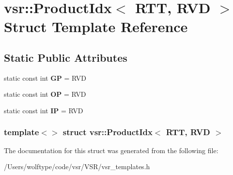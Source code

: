 \hypertarget{structvsr_1_1_product_idx_3_01_r_t_t_00_01_r_v_d_01_4}{\section{vsr\-:\-:Product\-Idx$<$ R\-T\-T, R\-V\-D $>$ Struct Template Reference}
\label{structvsr_1_1_product_idx_3_01_r_t_t_00_01_r_v_d_01_4}
}
\subsection*{Static Public Attributes}
\begin{DoxyCompactItemize}
\item 
\hypertarget{structvsr_1_1_product_idx_3_01_r_t_t_00_01_r_v_d_01_4_a11702264da52b8011ecba62f3e8ba9cc}{static const int {\bfseries G\-P} = R\-V\-D}\label{structvsr_1_1_product_idx_3_01_r_t_t_00_01_r_v_d_01_4_a11702264da52b8011ecba62f3e8ba9cc}

\item 
\hypertarget{structvsr_1_1_product_idx_3_01_r_t_t_00_01_r_v_d_01_4_a3cf9b0e1d77b5bbb03cc92c2091abf68}{static const int {\bfseries O\-P} = R\-V\-D}\label{structvsr_1_1_product_idx_3_01_r_t_t_00_01_r_v_d_01_4_a3cf9b0e1d77b5bbb03cc92c2091abf68}

\item 
\hypertarget{structvsr_1_1_product_idx_3_01_r_t_t_00_01_r_v_d_01_4_a22b809a9b3582d4d89a9709de8a5f64c}{static const int {\bfseries I\-P} = R\-V\-D}\label{structvsr_1_1_product_idx_3_01_r_t_t_00_01_r_v_d_01_4_a22b809a9b3582d4d89a9709de8a5f64c}

\end{DoxyCompactItemize}
\subsubsection*{template$<$$>$ struct vsr\-::\-Product\-Idx$<$ R\-T\-T, R\-V\-D $>$}



The documentation for this struct was generated from the following file\-:\begin{DoxyCompactItemize}
\item 
/\-Users/wolftype/code/vsr/\-V\-S\-R/vsr\-\_\-templates.\-h\end{DoxyCompactItemize}
